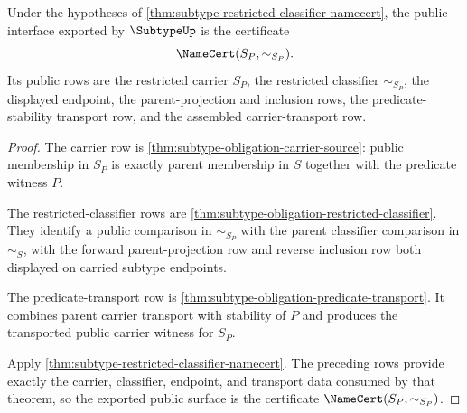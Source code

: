 \begin{theorem}
\label{thm:subtype-public-namecert-export}
Under the hypotheses of \autoref{thm:subtype-restricted-classifier-namecert}, the public interface exported by $\SubtypeUp$ is the certificate
$$
\NameCert(S_P,\sim_{S_P}).
$$
Its public rows are the restricted carrier $S_P$, the restricted classifier $\sim_{S_P}$, the displayed endpoint, the parent-projection and inclusion rows, the predicate-stability transport row, and the assembled carrier-transport row.
\end{theorem}
\begin{proof}
The carrier row is \autoref{thm:subtype-obligation-carrier-source}: public membership in $S_P$ is exactly parent membership in $S$ together with the predicate witness $P$.

The restricted-classifier rows are \autoref{thm:subtype-obligation-restricted-classifier}. They identify a public comparison in $\sim_{S_P}$ with the parent classifier comparison in $\sim_S$, with the forward parent-projection row and reverse inclusion row both displayed on carried subtype endpoints.

The predicate-transport row is \autoref{thm:subtype-obligation-predicate-transport}. It combines parent carrier transport with stability of $P$ and produces the transported public carrier witness for $S_P$.

Apply \autoref{thm:subtype-restricted-classifier-namecert}. The preceding rows provide exactly the carrier, classifier, endpoint, and transport data consumed by that theorem, so the exported public surface is the certificate $\NameCert(S_P,\sim_{S_P})$.
\end{proof}

